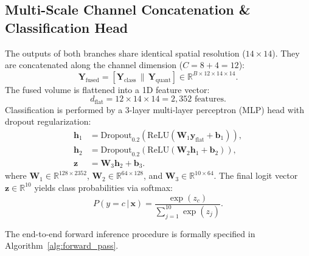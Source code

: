 \documentclass[journal]{IEEEtran}
\begin{document}
\subsection{Multi-Scale Channel Concatenation \& Classification Head}
The outputs of both branches share identical spatial resolution ($14 \times 14$). They are concatenated along the channel dimension ($C = 8 + 4 = 12$):
\begin{equation}
\mathbf{Y}_{\mathrm{fused}} = \left[ \mathbf{Y}_{\mathrm{class}} \,\|\, \mathbf{Y}_{\mathrm{quant}} \right] \in \mathbb{R}^{B \times 12 \times 14 \times 14}.
\label{eq:channel_concat}
\end{equation}
The fused volume is flattened into a 1D feature vector:
\begin{equation}
d_{\mathrm{flat}} = 12 \times 14 \times 14 = 2,352 \text{ features}.
\label{eq:flatten_dim}
\end{equation}
Classification is performed by a 3-layer multi-layer perceptron (MLP) head with dropout regularization:
\begin{align}
\mathbf{h}_1 &= \mathrm{Dropout}_{0.2}(\mathrm{ReLU}(\mathbf{W}_1 \mathbf{y}_{\mathrm{flat}} + \mathbf{b}_1)), \nonumber \\
\mathbf{h}_2 &= \mathrm{Dropout}_{0.2}(\mathrm{ReLU}(\mathbf{W}_2 \mathbf{h}_1 + \mathbf{b}_2)), \nonumber \\
\mathbf{z} &= \mathbf{W}_3 \mathbf{h}_2 + \mathbf{b}_3.
\label{eq:dense_head}
\end{align}
where $\mathbf{W}_1 \in \mathbb{R}^{128 \times 2352}$, $\mathbf{W}_2 \in \mathbb{R}^{64 \times 128}$, and $\mathbf{W}_3 \in \mathbb{R}^{10 \times 64}$. The final logit vector $\mathbf{z} \in \mathbb{R}^{10}$ yields class probabilities via softmax:
\begin{equation}
P(y = c \,|\, \mathbf{x}) = \frac{\exp(z_c)}{\sum_{j=1}^{10} \exp(z_j)}.
\label{eq:softmax}
\end{equation}

The end-to-end forward inference procedure is formally specified in Algorithm~\ref{alg:forward_pass}.
\end{document}
